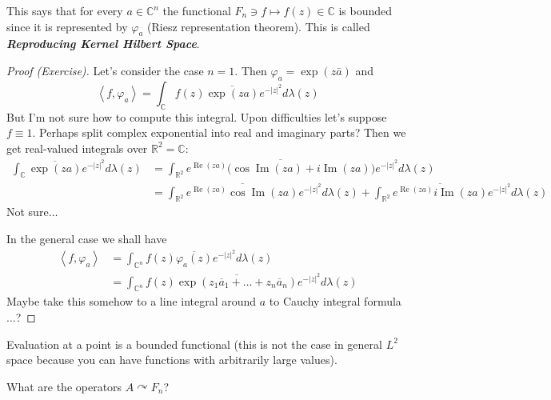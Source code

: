 \begin{remark}
\label{remark-erdnigor-rkhs}
This says that for every $a\in\mathbb{C}^{n}$
the functional $F_n\ni f\mapsto
f(z)\in\mathbb{C}$ is bounded since it is
represented by $\varphi_a$ (Riesz
representation theorem). This is called
{\it\bf Reproducing Kernel Hilbert Space}.
\end{remark}

\begin{proof}[Proof (Exercise)]
Let's consider the case $n=1$. Then
$\varphi_a=\operatorname{exp}(z\bar{a})$ and
$$\left\langle{} f,\varphi_a \right\rangle{}
=\int_{\mathbb{C}}f(z)
\overline{\operatorname{exp}(za)
}e^{-|z|^2}d \lambda(z)$$
But I'm not sure how to compute this
integral. Upon difficulties let's suppose
$f\equiv1$. Perhaps split complex exponential
into real and imaginary parts? Then we get
real-valued integrals over
$\mathbb{R}^{2}=\mathbb{C}$:
$$
\begin{aligned}
\int_{\mathbb{C}}\overline{\operatorname{exp}
(za)}
e^{-|z|^2}d
\lambda(z)&=\int_{\mathbb{R}^{2}}
\overline{e^{\operatorname{Re}(za)}\big(\cos
\operatorname{Im}(za)+i
\operatorname{Im}(za)\big)}e^{-|z|^2}d
\lambda(z)\\
&=
\int_{\mathbb{R}^{2}}
\overline{e^{\operatorname{Re}(za)}\cos
\operatorname{Im}(za)}e^{-|z|^2}d
\lambda(z)+\int_{\mathbb{R}^{2}}
\overline{e^{\operatorname{Re}(za)}i
\operatorname{Im}(za)}e^{-|z|^2}d \lambda(z)
\end{aligned}
$$
Not sure$\ldots$

In the general case we shall have
$$
\begin{aligned}
\left\langle{} f,\varphi_a \right\rangle{}
&=\int_{\mathbb{C}^n}f(z)
\overline{\varphi_a(z)}e^{-|z|^2}d\lambda(z)
\\
&=\int_{\mathbb{C}^{n}}f(z)
\overline{\operatorname{exp}(z_1\overline{a}
_1+\ldots
+z_n\overline{a}_n)}e^{-|z|^2}d \lambda(z)
\end{aligned}
$$
Maybe take this somehow to a line integral
around $a$ to Cauchy integral
formula$\ldots$?
\end{proof}

\begin{remark}
\label{remark-erdnigor-evaluation}
Evaluation at a point is a bounded functional
(this is not the case in general  $L^2$ space
because you can have functions with
arbitrarily large values).
\end{remark}

\medskip{}
What are the operators $A\curvearrowright
F_n$?

